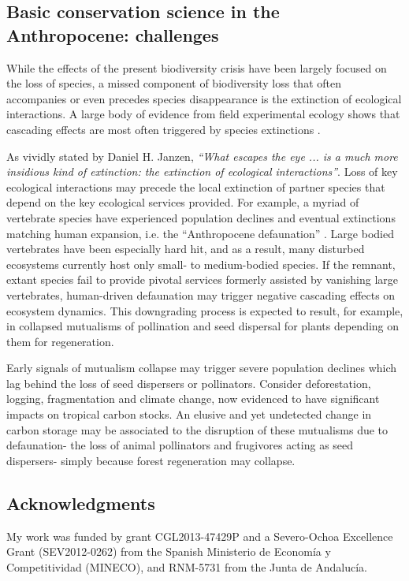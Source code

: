 \documentclass[10pt,letterpaper]{article}
\begin{document}
\subsection*{Basic conservation science in the Anthropocene: challenges}
While the effects of the present biodiversity crisis have been largely focused on the loss of species, a missed component of biodiversity loss that often accompanies or even precedes species disappearance is the extinction of ecological interactions. A large body of evidence from field experimental ecology shows that cascading effects are most often triggered by species extinctions \cite{Dirzo:2014}. 

As vividly stated by Daniel H. Janzen, \textit{“What escapes the eye ... is a much more insidious kind of extinction: the extinction of ecological interactions”}. Loss of key ecological interactions may precede the local extinction of partner species that depend on the key ecological services provided. For example, a myriad of vertebrate species have experienced population declines and eventual extinctions matching human expansion, i.e. the “Anthropocene defaunation” \cite{Dirzo:2014}. Large bodied vertebrates have been especially hard hit, and as a result, many disturbed ecosystems currently host only small- to medium-bodied species. If the remnant, extant species fail to provide pivotal services formerly assisted by vanishing large vertebrates, human-driven defaunation may trigger negative cascading effects on ecosystem dynamics. This downgrading process is expected to result, for example, in collapsed mutualisms of pollination and seed dispersal for plants depending on them for regeneration.

Early signals of mutualism collapse may trigger severe population declines which lag behind the loss of seed dispersers or pollinators. Consider deforestation, logging, fragmentation and climate change, now evidenced to have significant impacts on tropical carbon stocks. An elusive and yet undetected change in carbon storage may be associated to the disruption of these mutualisms due to defaunation- the loss of animal pollinators and frugivores acting as seed dispersers- simply because forest regeneration may collapse.

\subsection*{Acknowledgments}
My work was funded by grant CGL2013-47429P and a Severo-Ochoa Excellence Grant (SEV2012-0262) from the Spanish Ministerio de Econom\'ia y Competitividad (MINECO), and RNM-5731 from the Junta de Andaluc\'ia. 
\end{document}
